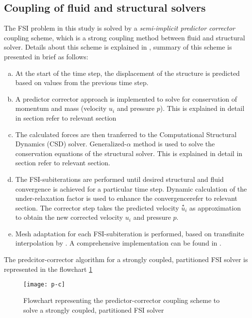 \subsection{Coupling of fluid and structural solvers}

The FSI problem in this study is solved by a \textit{semi-implicit predictor corrector} coupling scheme, which is a strong coupling method between fluid and structural solver. Details about this scheme is explained in \citet{breuer2012fluid}, summary of this scheme is presented in brief as follows:
\begin{enumerate}[(a)]
 \item At the start of the time step, the displacement of the structure is predicted based on values from the previous time step.
 \item A predictor corrector approach is implemented to solve for conservation of momentum and mass (velocity $u_{i}$ and pressure $p$). This is explained in detail in section {refer to relevant section}
 \item The calculated forces are then tranferred to the Computational Structural Dynamics (CSD) solver. Generalized-$\alpha$ method is used to solve the conservation equations of the structural solver. This is explained in detail in section {refer to relevant section}.
 \item The FSI-subiterations are performed until desired structural and fluid convergence is achieved for a particular time step. Dynamic calculation of the under-relaxation factor is used to enhance the convergence{refer to relevant section}. The corrector step takes the predicted velocity $\overset{\star}{u}_{i}$ as approximation to obtain the new corrected velocity $u_{i}$ and pressure $p$. 
 \item Mesh adaptation for each FSI-subiteration is performed, based on transfinite interpolation by \citet{thompson1985numerical}. A comprehensive implementation can be found in \citet{munsch2011numerical}. 
\end{enumerate}
\par
The predcitor-corrector algorithm for a strongly coupled, partitioned FSI solver is represented in the flowchart \ref{fig:2.6}

\begin{figure}[h]
 \texttt{[image: p-c]}
 \caption{Flowchart representing the predictor-corrector coupling scheme to solve a strongly coupled, partitioned FSI solver \citet{munsch2011numerical}}
 \label{fig:2.6}
\end{figure}

